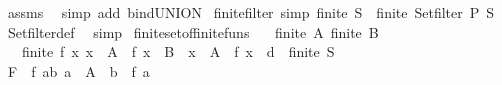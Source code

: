 \begin{isabellebody}
%
\isadelimproof
%
\endisadelimproof
%
\isatagproof
{}\isamarkupfalse%
\ assms\ \isamarkupfalse%
\ {\isacharparenleft}{\kern0pt}simp\ add{\isacharcolon}{\kern0pt}\ bind{\isacharunderscore}{\kern0pt}UNION{\isacharparenright}{\kern0pt}%
\endisatagproof
{\isafoldproof}%
%
\isadelimproof
\isanewline
%
\endisadelimproof
\isanewline
{}\isamarkupfalse%
\ finite{\isacharunderscore}{\kern0pt}filter\ {\isacharbrackleft}{\kern0pt}simp{\isacharbrackright}{\kern0pt}{\isacharcolon}{\kern0pt}\ {\isachardoublequoteopen}finite\ S\ {\isasymLongrightarrow}\ finite\ {\isacharparenleft}{\kern0pt}Set{\isachardot}{\kern0pt}filter\ P\ S{\isacharparenright}{\kern0pt}{\isachardoublequoteclose}\isanewline
%
\isadelimproof
%
\endisadelimproof
%
\isatagproof
{}\isamarkupfalse%
\ Set{\isachardot}{\kern0pt}filter{\isacharunderscore}{\kern0pt}def\ \isamarkupfalse%
\ simp%
\endisatagproof
{\isafoldproof}%
%
\isadelimproof
\isanewline
%
\endisadelimproof
\isanewline
{}\isamarkupfalse%
\ finite{\isacharunderscore}{\kern0pt}set{\isacharunderscore}{\kern0pt}of{\isacharunderscore}{\kern0pt}finite{\isacharunderscore}{\kern0pt}funs{\isacharcolon}{\kern0pt}\isanewline
\ \ \ {\isachardoublequoteopen}finite\ A{\isachardoublequoteclose}\ {\isachardoublequoteopen}finite\ B{\isachardoublequoteclose}\isanewline
\ \ \ {\isachardoublequoteopen}finite\ {\isacharbraceleft}{\kern0pt}f{\isachardot}{\kern0pt}\ {\isasymforall}x{\isachardot}{\kern0pt}\ {\isacharparenleft}{\kern0pt}x\ {\isasymin}\ A\ {\isasymlongrightarrow}\ f\ x\ {\isasymin}\ B{\isacharparenright}{\kern0pt}\ {\isasymand}\ {\isacharparenleft}{\kern0pt}x\ {\isasymnotin}\ A\ {\isasymlongrightarrow}\ f\ x\ {\isacharequal}{\kern0pt}\ d{\isacharparenright}{\kern0pt}{\isacharbraceright}{\kern0pt}{\isachardoublequoteclose}\ {\isacharparenleft}{\kern0pt}\ {\isachardoublequoteopen}finite\ {\isacharquery}{\kern0pt}S{\isachardoublequoteclose}{\isacharparenright}{\kern0pt}\isanewline
%
\isadelimproof
%
\endisadelimproof
%
\isatagproof
{}\isamarkupfalse%
\ {\isacharminus}{\kern0pt}\isanewline
\ \ \isamarkupfalse%
\ {\isacharquery}{\kern0pt}F\ {\isacharequal}{\kern0pt}\ {\isachardoublequoteopen}{\isasymlambda}f{\isachardot}{\kern0pt}\ {\isacharbraceleft}{\kern0pt}{\isacharparenleft}{\kern0pt}a{\isacharcomma}{\kern0pt}b{\isacharparenright}{\kern0pt}{\isachardot}{\kern0pt}\ a\ {\isasymin}\ A\ {\isasymand}\ b\ {\isacharequal}{\kern0pt}\ f\ a{\isacharbraceright}{\kern0pt}{\isachardoublequoteclose}\isanewline

\end{isabellebody}
